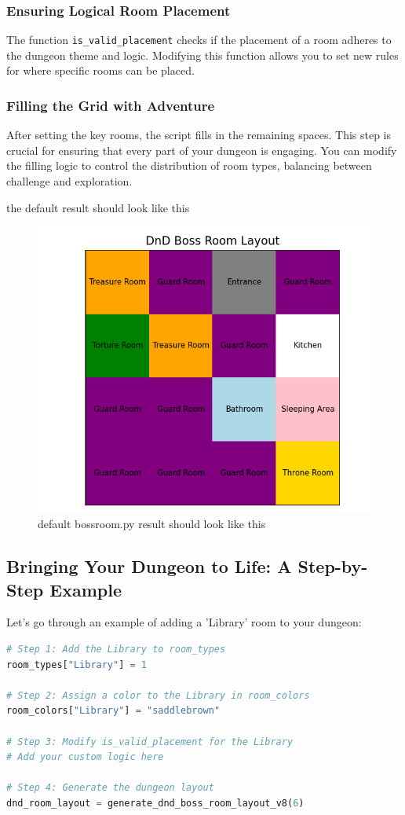 \documentclass[10pt,twocolumn]{article}
\begin{document}
\subsubsection{Ensuring Logical Room Placement}
The function \texttt{is\_valid\_placement} checks if the placement of a room adheres to the dungeon theme and logic. Modifying this function allows you to set new rules for where specific rooms can be placed.

\subsubsection{Filling the Grid with Adventure}
After setting the key rooms, the script fills in the remaining spaces. This step is crucial for ensuring that every part of your dungeon is engaging. You can modify the filling logic to control the distribution of room types, balancing between challenge and exploration.

the default result should look like this
\begin{figure}
    \centering
    \includegraphics[width=0.5\linewidth]{bossroom.png}
    \caption{default bossroom.py result should look like this}
    \label{fig:enter-label}
\end{figure}
\subsection{Bringing Your Dungeon to Life: A Step-by-Step Example}
Let's go through an example of adding a 'Library' room to your dungeon:

\begin{lstlisting}[language=Python]
# Step 1: Add the Library to room_types
room_types["Library"] = 1

# Step 2: Assign a color to the Library in room_colors
room_colors["Library"] = "saddlebrown"

# Step 3: Modify is_valid_placement for the Library
# Add your custom logic here

# Step 4: Generate the dungeon layout
dnd_room_layout = generate_dnd_boss_room_layout_v8(6)
\end{lstlisting}
\end{document}

